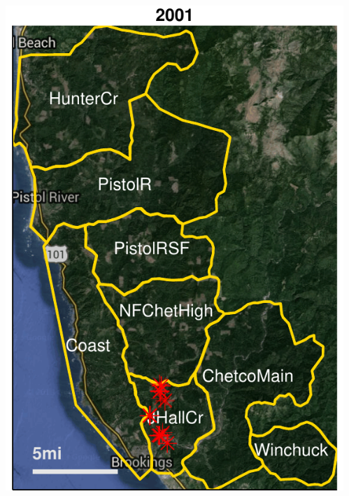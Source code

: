 \documentclass{beamer}\usepackage[]{graphicx}\usepackage[]{color}
\begin{document}






\begin{frame}[allowpagebreak,T]

	\begin{columns}[allowpagebreak,T]
		\begin{column}{0.5\paperwidth}
			\centering
			\includegraphics[keepaspectratio,width=0.48\paperwidth]{figure/2001-1.pdf}
		\end{column}
		\begin{column}{0.5\paperwidth}
			\centering

\end{column}
\end{columns}
\end{frame}
\end{document}
